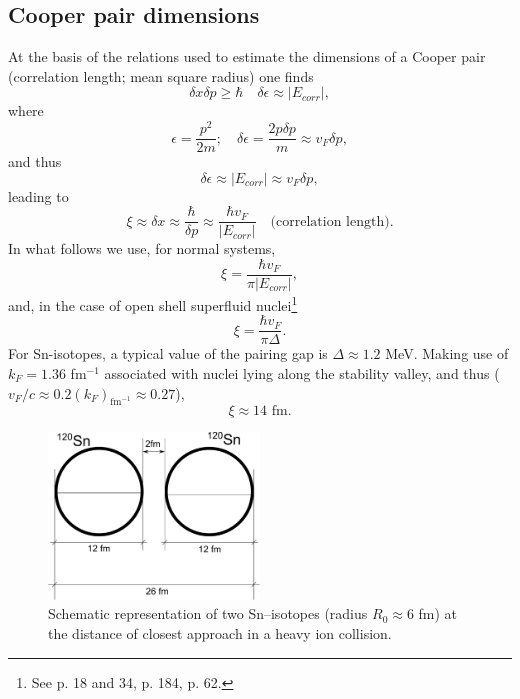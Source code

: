\subsection{Cooper pair dimensions}\label{S3.4.1}
 At the basis of the relations used to estimate  the dimensions of a Cooper pair (correlation length; mean square radius) one finds 
\begin{equation}
\delta x\delta p\ge \hbar\quad \delta\epsilon\approx |E_{corr}|,
\end{equation}
where
\begin{equation}
\epsilon=\frac{p^2}{2m};\quad\delta\epsilon=\frac{2p\delta p}{m}\approx v_F\delta p,
\end{equation}
and thus 
\begin{equation}
\delta\epsilon\approx  |E_{corr}|\approx v_F\delta p,
\end{equation}
leading to
\begin{equation}\label{eq3.4.9}
\xi\approx\delta x\approx\frac{\hbar}{\delta p}\approx \frac{\hbar v_F}{ |E_{corr}|}\quad \text{(correlation length)}.
\end{equation}
In what follows we use, for normal systems, 
\begin{equation}
\xi=\frac{\hbar v_F}{ \pi|E_{corr}|},
\end{equation}
and, in the case of open shell superfluid nuclei\footnote{See \cite{Schrieffer:64} p. 18 and 34, \cite{Leggett:06} p. 184, \cite{Annett:13} p. 62.}
\begin{equation}
\xi=\frac{\hbar v_F}{ \pi\Delta}.
\end{equation}
For Sn-isotopes, a typical value of the pairing gap is $\Delta\approx 1.2$ MeV. Making use of $k_F=1.36$ fm$^{-1}$ associated with nuclei lying along the stability valley, and thus ($v_F/c\approx 0.2 (k_F)_{\text{fm}^{-1}}\approx0.27$),
\begin{equation}
\xi\approx14\text{ fm}.
\end{equation}
\begin{figure}
\centerline{\includegraphics*[width=0.5\textwidth,angle=0]{nutshell/figs/fig_1.pdf}}
\caption{Schematic representation of two Sn--isotopes (radius $R_0\approx 6$ fm) at the distance of closest approach in a heavy ion collision.}\label{fig_1}
\end{figure}


